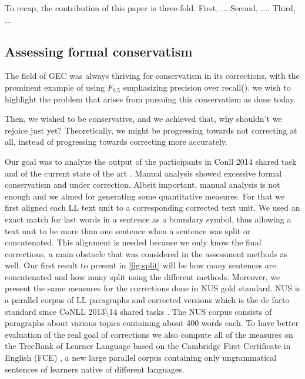 \documentclass[english]{article}
\begin{document}
To recap, the contribution of this paper is three-fold. First, ...
Second, ....
Third, ...


\subsection{Assessing formal conservatism\label{sec:formal_conservatism}}

The field of GEC was always thriving for conservatism in its corrections, with the prominent example of using $F_{0.5}$ emphasizing precision over recall(\cite{ng2014conll}). we wish to highlight the problem that arises from pursuing this conservatism as done today.

Then, we wished to be conservative, and we achieved that, why shouldn't we rejoice just yet? Theoretically, we might be progressing towards not correcting at all, instead of progressing towards correcting more accurately. 

Our goal was to analyze the output of the participants in Conll
2014 shared task\cite{ng2014conll} and of the current state of the
art \cite{rozovskaya2014building}. 
Manual analysis showed excessive formal conservatism and under correction. Albeit important, manual analysis is not enough and we aimed for generating some quantitative measures. 
For that we first aligned each LL text unit
to a corresponding corrected text unit. We used an exact match for last words in a sentence as a boundary symbol, thus allowing a text unit to be more than one sentence when a sentence was split or concatenated. 
This alignment is needed because we only know the final corrections, a main obstacle that was considered
in the assessment methods as well\cite{dahlmeier2012better}.
Our first result to present in \ref{fig:split} will be how many sentences are concatenated and
how many split using the different methods. Moreover, we present the same measures for the corrections done in  NUS\cite{dahlmeier2013building} gold standard. NUS is a parallel
corpus of LL paragraphs and corrected versions which is the de
facto standard since CoNLL 2013\textbackslash{}14 shared tasks \cite{kao2013conll,ng2014conll}.
The NUS corpus consists of paragraphs about
various topics containing about 400 words each.
To have better evaluation of the real goal of corrections we also
compute all of the measures on the TreeBank of Learner Language \cite{berzak2016universal}based
on the Cambridge First Certificate in English (FCE) \cite{yannakoudakis2011new},
a new large parallel corpus containing only ungrammatical sentences of learners native of different languages.
\end{document}
